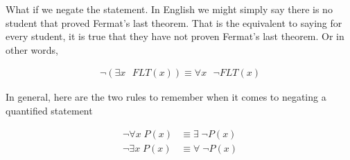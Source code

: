 \documentclass[12pt]{article}
\begin{document}
What if we negate the statement. In English we might simply say there is no student that proved Fermat's last theorem. That is the equivalent to saying for every student, it is true that they have not proven Fermat's last theorem. Or in other words, 

\begin{align*}
\neg (\exists x \text{ } FLT(x)) \equiv \forall x \text{ } \neg FLT(x)
\end{align*}


In general, here are the two rules to remember when it comes to negating a quantified statement

\begin{align*}
\neg \forall x \; P(x) &\equiv \exists \; \neg P(x) \\
\neg \exists x \; P(x) &\equiv \forall \; \neg P(x)
\end{align*}
\end{document}
